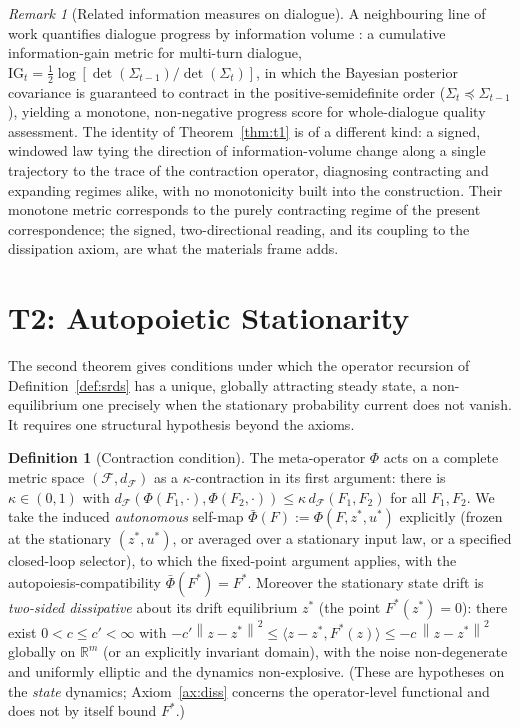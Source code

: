 \documentclass[11pt]{article}
\theoremstyle{plain}
\theoremstyle{definition}
\newtheorem{definition}[theorem]{Definition}
\theoremstyle{remark}
\newtheorem{remark}[theorem]{Remark}
\newcommand{\R}{\mathbb{R}}
\newcommand{\norm}[1]{\left\lVert#1\right\rVert}
\begin{document}
\begin{remark}[Related information measures on dialogue]\label{rem:t1related}
A neighbouring line of work quantifies dialogue progress by information volume \citep{he2026infogain}: a cumulative information-gain metric for multi-turn dialogue, $\mathrm{IG}_t=\tfrac12\log[\det(\Sigma_{t-1})/\det(\Sigma_t)]$, in which the Bayesian posterior covariance is guaranteed to contract in the positive-semidefinite order ($\Sigma_t\preceq\Sigma_{t-1}$), yielding a monotone, non-negative progress score for whole-dialogue quality assessment. The identity of Theorem~\ref{thm:t1} is of a different kind: a signed, windowed law tying the direction of information-volume change along a single trajectory to the trace of the contraction operator, diagnosing contracting and expanding regimes alike, with no monotonicity built into the construction. Their monotone metric corresponds to the purely contracting regime of the present correspondence; the signed, two-directional reading, and its coupling to the dissipation axiom, are what the materials frame adds.
\end{remark}

\section{T2: Autopoietic Stationarity}\label{sec:t2}

The second theorem gives conditions under which the operator recursion of Definition~\ref{def:srds} has a unique, globally attracting steady state, a non-equilibrium one precisely when the stationary probability current does not vanish. It requires one structural hypothesis beyond the axioms.

\begin{definition}[Contraction condition]\label{cond:contraction}
The meta-operator $\Phi$ acts on a complete metric space $(\mathcal F,d_{\mathcal F})$ as a $\kappa$-contraction in its first argument: there is $\kappa\in(0,1)$ with $d_{\mathcal F}(\Phi(F_1,\cdot),\Phi(F_2,\cdot))\le\kappa\,d_{\mathcal F}(F_1,F_2)$ for all $F_1,F_2$. We take the induced \emph{autonomous} self-map $\bar\Phi(F):=\Phi(F,z^*,u^*)$ explicitly (frozen at the stationary $(z^*,u^*)$, or averaged over a stationary input law, or a specified closed-loop selector), to which the fixed-point argument applies, with the autopoiesis-compatibility $\bar\Phi(F^*)=F^*$. Moreover the stationary state drift is \emph{two-sided dissipative} about its drift equilibrium $z^*$ (the point $F^*(z^*)=0$): there exist $0<c\le c'<\infty$ with $-c'\norm{z-z^*}^2\le\langle z-z^*,F^*(z)\rangle\le-c\,\norm{z-z^*}^2$ globally on $\R^m$ (or an explicitly invariant domain), with the noise non-degenerate and uniformly elliptic and the dynamics non-explosive. (These are hypotheses on the \emph{state} dynamics; Axiom~\ref{ax:diss} concerns the operator-level functional and does not by itself bound $F^*$.)
\end{definition}
\end{document}

